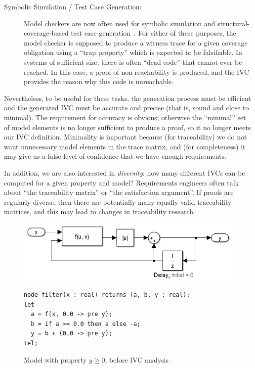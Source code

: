 \begin{description}
    \item[Symbolic Simulation / Test Case Generation:]  Model checkers are now often used for symbolic simulation and structural-coverage-based test case generation~\cite{SimulinkDesignVerifier,Whalen13:OMCDC}.  For either of these purposes, the model checker is supposed to produce a witness trace for a given coverage obligation using a ``trap property'' which is expected to be falsifiable.  In systems of sufficient size, there is often ``dead code'' that cannot ever be reached.  In this case, a proof of non-reachability is produced, and the IVC provides the reason why this code is unreachable.
\end{description}
\noindent Nevertheless, to be useful for these tasks, the generation
process must be efficient and the generated IVC must be
accurate and precise (that is, sound and close to minimal).  The requirement for accuracy is obvious; otherwise the ``minimal'' set of model elements is no longer sufficient to produce a proof, so it no longer meets our IVC definition.  Minimality is important because (for traceability) we do not want unnecessary model elements in the trace matrix, and (for completeness) it may give us a false level of confidence that we have enough requirements.

In addition, %
we are also interested in {\em diversity}:  how many different IVCs can be computed for a given property and model? Requirements engineers often talk about ``the traceability matrix'' or ``the satisfaction argument''.  If proofs are regularly diverse, then there are potentially many equally valid traceability matrices, and this may lead to changes in traceability research.

\begin{figure}[t]
\centering
\includegraphics[width=\columnwidth]{figs/simulink.png}
{\smaller
\begin{verbatim}
node filter(x : real) returns (a, b, y : real);
let
  a = f(x, 0.0 -> pre y);
  b = if a >= 0.0 then a else -a;
  y = b + (0.0 -> pre y);
tel;
\end{verbatim}
}
\vspace{-0.1in}
\caption{Model with property $y \geq 0$, before IVC analysis}
\label{fig:ex-before}
\end{figure}

